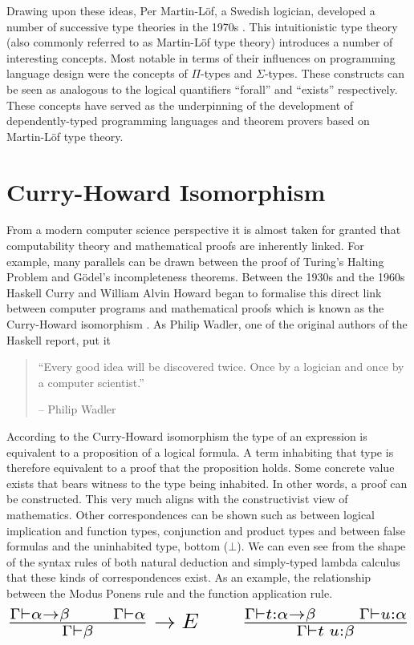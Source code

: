 \documentclass[a4paper, notitlepage]{report}
\begin{document}
Drawing upon these ideas, Per Martin-Löf, a Swedish logician, developed a number
of successive type theories in the 1970s \cite{martin-lof_intuitionistic_1984}.
This intuitionistic type theory (also commonly referred to as Martin-Löf type
theory) introduces a number of interesting concepts. Most notable in terms of
their influences on programming language design were the concepts of \(\Pi\)-types
and \(\Sigma\)-types. These constructs can be seen as analogous to the logical
quantifiers ``forall'' and ``exists'' respectively. These concepts have served
as the underpinning of the development of dependently-typed programming
languages and theorem provers based on Martin-Löf type theory.

\section{Curry-Howard Isomorphism}
\label{sec:org0da9ebe}
From a modern computer science perspective it is almost taken for granted that
computability theory and mathematical proofs are inherently linked. For example,
many parallels can be drawn between the proof of Turing's Halting Problem and
Gödel's incompleteness theorems. Between the 1930s and the 1960s Haskell Curry
and William Alvin Howard began to formalise this direct link between computer
programs and mathematical proofs which is known as the Curry-Howard isomorphism
\cite{mcadams_tutor_2013}. As Philip Wadler, one of the original authors of the
Haskell report, put it \cite{strange_loop_2015,wadler_propos_2015}

\begin{quote}
``Every good idea will be discovered twice. Once by a logician and once by a
computer scientist.''

-- Philip Wadler
\end{quote}

According to the Curry-Howard isomorphism the type of an expression is
equivalent to a proposition of a logical formula. A term inhabiting that type is
therefore equivalent to a proof that the proposition holds. Some concrete value
exists that bears witness to the type being inhabited. In other words, a proof
can be constructed. This very much aligns with the constructivist view of
mathematics. Other correspondences can be shown such as between logical
implication and function types, conjunction and product types and between false
formulas and the uninhabited type, bottom (\(\bot\)). We can even see from the
shape of the syntax rules of both natural deduction and simply-typed lambda
calculus that these kinds of correspondences exist. As an example, the
relationship between the Modus Ponens rule and the function application rule.
\[ \scalebox{2}{$\frac{\Gamma \vdash \alpha \rightarrow \beta \qquad \Gamma
\vdash \alpha}{\Gamma \vdash \beta} \rightarrow E \qquad \frac{\Gamma \vdash
t:\alpha \rightarrow \beta \qquad \Gamma \vdash u:\alpha}{\Gamma \vdash
t\;u:\beta}$} \]
\end{document}

